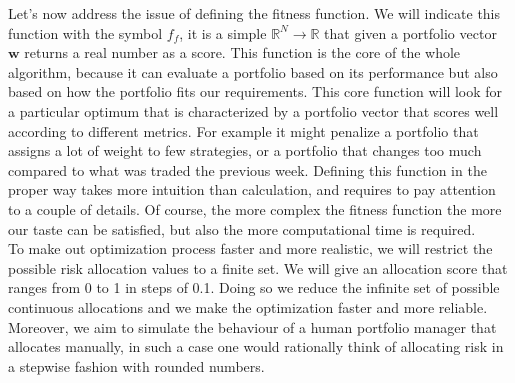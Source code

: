 Let's now address the issue of defining the fitness function. We will indicate this function with the symbol $f_f$, it is a simple $\mathbb{R}^N \rightarrow \mathbb{R}$ that given a portfolio vector $\mathbf{w}$ returns a real number as a score. This function is the core of the whole algorithm, because it can evaluate a portfolio based on its performance but also based on how the portfolio fits our requirements. This core function will look for a particular optimum that is characterized by a portfolio vector that scores well according to different metrics. For example it might penalize a portfolio that assigns a lot of weight to few strategies, or a portfolio that changes too much compared to what was traded the previous week. Defining this function in the proper way takes more intuition than calculation, and requires to pay attention to a couple of details. Of course, the more complex the fitness function the more our taste can be satisfied, but also the more computational time is required.\\
To make out optimization process faster and more realistic, we will restrict the possible risk allocation values to a finite set. We will give an allocation score that ranges from 0 to 1 in steps of 0.1. Doing so we reduce the infinite set of possible continuous allocations and we make the optimization faster and more reliable. Moreover, we aim to simulate the behaviour of a human portfolio manager that allocates manually, in such a case one would rationally think of allocating risk in a stepwise fashion with rounded numbers.\\ 
